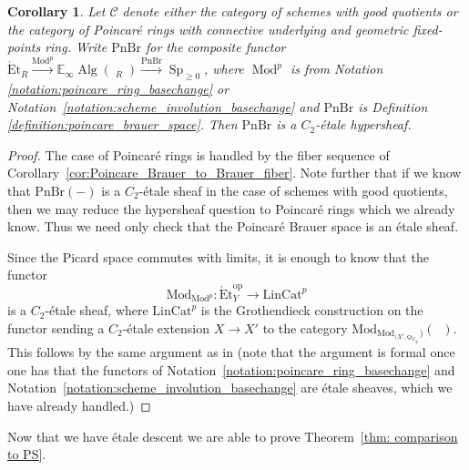 \documentclass{article}
\DeclareMathOperator{\Alg}{Alg} %
\DeclareMathOperator{\Catpidem}{Cat^p_{\infty, idem}} %
\DeclareMathOperator{\Mod}{Mod} %
\DeclareMathOperator{\Spectra}{Sp} %
\newcommand{\EE}{\mathbb{E}}
\newcommand{\op}{\mathrm{op}} %
\newcommand{\pnbr}{\ensuremath{\mathrm{PnBr}}}
\newtheorem{corollary}[equation]{Corollary}
\theoremstyle{definition}
\begin{document}
\begin{corollary}\label{cor:pnbr_as_etale_sheaf_affine_spectral}
    Let $\mathcal{C}$ denote either the category of schemes with good quotients or the category of Poincar{\'e} rings with connective underlying and geometric fixed-points ring. Write $ \pnbr $ for the composite functor $ \mathrm{\acute{E}t}_R \xrightarrow{\Mod^p} \EE_\infty\Alg\left(\Catpidem_{R}\right) \xrightarrow{\pnbr} \Spectra_{\geq 0} $, where $ \Mod^p $ is from Notation \ref{notation:poincare_ring_basechange} or Notation~\ref{notation:scheme_involution_basechange} and $ \pnbr $ is Definition \ref{definition:poincare_brauer_space}. 
    Then $ \pnbr $ is a $C_2$-\'etale hypersheaf. 
\end{corollary} 
\begin{proof}
    The case of Poincar{\'e} rings is handled by the fiber sequence of Corollary~\ref{cor:Poincare_Brauer_to_Brauer_fiber}. Note further that if we know that $\pnbr(-)$ is a $C_2$-\'etale sheaf in the case of schemes with good quotients, then we may reduce the hypersheaf question to Poincar{\'e} rings which we already know. Thus we need only check that the Poincar{\'e} Brauer space is an \'etale sheaf. 

    Since the Picard space commutes with limits, it is enough to know that the functor \[\mathrm{Mod}_{\mathrm{Mod}^p}:\mathrm{\acute{E}t}_Y^\op \to \mathrm{LinCat}^p \] is a $C_2$-\'etale sheaf, where $\mathrm{LinCat}^p$ is the Grothendieck construction on the functor sending a $C_2$-{\'e}tale extension $X\to X'$ to the category $\mathrm{Mod}_{\mathrm{Mod}_{(X',\Qoppa_{\underline{\mathcal{O}}_{X'}}})}(\Catpidem)$. This follows by the same argument as in \cite[Theorem 5.13]{Lurie2011Descent} (note that the argument is formal once one has that the functors of Notation~\ref{notation:poincare_ring_basechange} and Notation~\ref{notation:scheme_involution_basechange} are \'etale sheaves, which we have already handled.)
\end{proof} 

Now that we have \'etale descent we are able to prove Theorem~\ref{thm: comparison to PS}.
\end{document}
